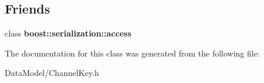 \subsection*{Friends}
\begin{DoxyCompactItemize}
\item 
\hypertarget{classChannelKey_ac98d07dd8f7b70e16ccb9a01abf56b9c}{class {\bfseries boost\-::serialization\-::access}}\label{classChannelKey_ac98d07dd8f7b70e16ccb9a01abf56b9c}

\end{DoxyCompactItemize}


The documentation for this class was generated from the following file\-:\begin{DoxyCompactItemize}
\item 
Data\-Model/Channel\-Key.\-h\end{DoxyCompactItemize}
